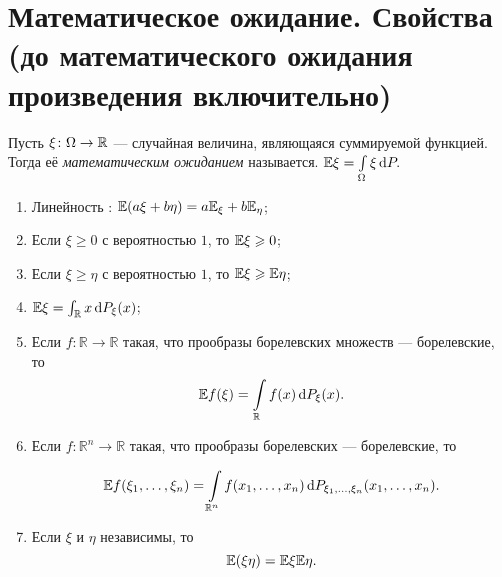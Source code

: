 \section{Математическое ожидание. Свойства (до математического ожидания произведения включительно)}


\begin{definition} Пусть $\xi \colon \Omega \to \mathbb{R}$ --- случайная величина, являющаяся суммируемой функцией. Тогда её \textit{математическим ожиданием} называется.
    $\EE \xi = \int\limits_\Omega \xi \dd P.$ 
\end{definition}

\begin{properties}[матожидания]
\enewline
    \begin{enumerate}
        \item Линейность : $\mathbb{E} (a\xi +b\eta) = a\mathbb{E} _\xi + b\mathbb{E} _\eta$;
        \item Если $\xi \ge0$ с вероятностью $1$, то $\mathbb{E} \xi\geqslant0$;
        \item Если $\xi\ge\eta$ с вероятностью $1$, то $\mathbb{E} \xi\geqslant \mathbb{E} \eta$;
        \item $\EE \xi = \intt_\mathbb{R}x\dd P_\xi(x)$;
        \item Если $f\colon \mathbb{R}\rightarrow \mathbb{R}$ такая, что прообразы борелевских множеств --- борелевские, то
              $$\EE f(\xi) = \int\limits_\mathbb{R}f(x)\dd P_\xi(x).$$
        \item Если $f: \mathbb{R}^n\rightarrow \mathbb{R}$ такая, что прообразы борелевских --- борелевские, то

              $$\EE f(\xi_1, \ldots, \xi_n) = \int\limits_{\mathbb{R}^n}f(x_1, \ldots, x_n)\dd P_{\xi_1, \ldots, \xi_n}(x_1, \ldots, x_n).$$


        \item Если $\xi$ и $\eta$ независимы, то 
        $$\mathbb{E} (\xi\eta) = \mathbb{E} \xi \mathbb{E} \eta.$$
    \end{enumerate}
\end{properties}

